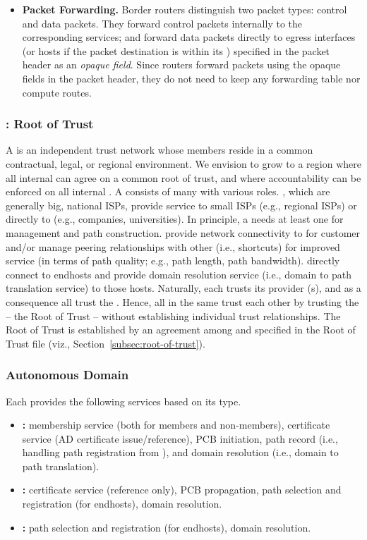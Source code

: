 \begin{itemize}
\item {\bf Packet Forwarding. } Border routers distinguish two packet types:
  control and data packets. They forward control packets internally to the
  corresponding services; and forward data packets directly to egress interfaces
  (or hosts if the packet destination is within its \AD) specified in the packet
  header as an \textit{opaque field}. Since routers forward packets using the
  opaque fields in the packet header, they do not need to keep any forwarding
  table nor compute routes.
\end{itemize}

\subsubsection{\TD: Root of Trust}

A \TD is an independent {trust} network whose members reside in a common
contractual, legal, or regional environment. We envision \TDs to grow to a
region where all internal \ADs can agree on a common root of trust, and where
accountability can be enforced on all internal \ADs. A \TD consists of many \ADs
with various roles. \TDC \ADs, which are generally big, national ISPs, provide
service to small ISPs (e.g., regional ISPs) or directly to \STUB \ADs (e.g.,
companies, universities). In principle, a \TD needs at least one \TDC \AD for
\TD management and path construction. \TRAN \ADs provide network connectivity to
\TDC for customer \ADs and/or manage peering relationships with other \TRAN \ADs
(i.e., shortcuts) for improved service (in terms of path quality; e.g., path
length, path bandwidth). \STUB \ADs directly connect to endhosts and provide
domain resolution service (i.e., domain to path translation service) to those
hosts. Naturally, each \AD trusts its provider \AD(s), and as a consequence all
\ADs trust the \TDC. Hence, all \STUB \ADs in the same \TD trust each other by
trusting the \TDC -- the Root of Trust -- without establishing individual trust
relationships. The Root of Trust is established by an agreement among \TDC \ADs
and specified in the Root of Trust file (viz., Section~\ref{subsec:root-of-trust}).

\subsubsection{Autonomous Domain}
Each \AD provides the following services based on its type.
\begin{itemize}
\item {\bf \TDC \AD: } \TD membership service (both for \TDC members and non-\TDC members), certificate service (AD certificate issue/reference), PCB initiation, path record (i.e., handling path registration from \STUB \ADs), and domain resolution (i.e., domain to path translation).
\item {\bf \TRAN \AD: } certificate service (reference only), PCB propagation, path selection and registration (for endhosts), domain resolution.
\item {\bf \STUB \AD: } path selection and registration (for endhosts), domain resolution. 
\end{itemize}

